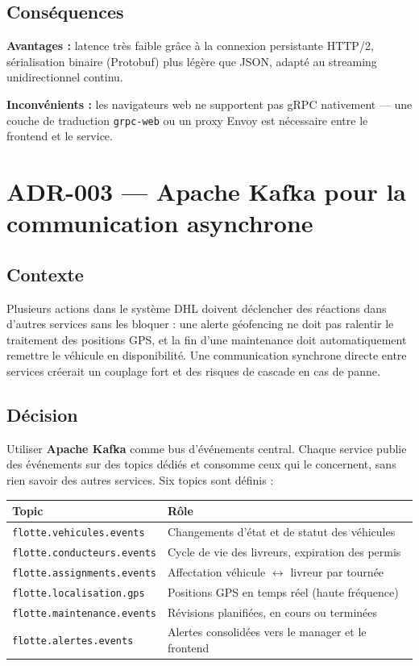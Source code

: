 \documentclass[10pt,a4paper]{article}
\begin{document}
\subsection{Conséquences}
\textbf{Avantages :} latence très faible grâce à la connexion persistante HTTP/2, sérialisation binaire (Protobuf) plus légère que JSON, adapté au streaming unidirectionnel continu.

\noindent\textbf{Inconvénients :} les navigateurs web ne supportent pas gRPC nativement --- une couche de traduction \texttt{grpc-web} ou un proxy Envoy est nécessaire entre le frontend et le service.

\newpage

\section{ADR-003 --- Apache Kafka pour la communication asynchrone}

\subsection{Contexte}
Plusieurs actions dans le système DHL doivent déclencher des réactions dans d'autres services sans les bloquer : une alerte géofencing ne doit pas ralentir le traitement des positions GPS, et la fin d'une maintenance doit automatiquement remettre le véhicule en disponibilité. Une communication synchrone directe entre services créerait un couplage fort et des risques de cascade en cas de panne.

\subsection{Décision}
Utiliser \textbf{Apache Kafka} comme bus d'événements central. Chaque service publie des événements sur des topics dédiés et consomme ceux qui le concernent, sans rien savoir des autres services. Six topics sont définis :

\vspace{4pt}
\begin{tabularx}{\linewidth}{lX}
  \toprule
  \small\textbf{Topic} & \small\textbf{Rôle} \\
  \midrule
  \texttt{flotte.vehicules.events}    & Changements d'état et de statut des véhicules \\
  \texttt{flotte.conducteurs.events}  & Cycle de vie des livreurs, expiration des permis \\
  \texttt{flotte.assignments.events}  & Affectation véhicule $\leftrightarrow$ livreur par tournée \\
  \texttt{flotte.localisation.gps}    & Positions GPS en temps réel (haute fréquence) \\
  \texttt{flotte.maintenance.events}  & Révisions planifiées, en cours ou terminées \\
  \texttt{flotte.alertes.events}      & Alertes consolidées vers le manager et le frontend \\
  \bottomrule
\end{tabularx}
\end{document}
